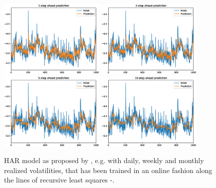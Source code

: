 \begin{figure}
    \begin{center}
        \includegraphics[width=0.45\textwidth]{Plots/Prediction/HAR_1step.eps}
        \includegraphics[width=0.45\textwidth]{Plots/Prediction/HAR_2step.eps} \\
        \includegraphics[width=0.45\textwidth]{Plots/Prediction/HAR_5step.eps}
        \includegraphics[width=0.45\textwidth]{Plots/Prediction/HAR_10step.eps}
    \end{center}
    \caption{HAR model as proposed by \cite{Corsi2009}, e.g. with daily, weekly and monthly realized volatilities, that has been trained in an online fashion along the lines of recursive least squares -.}
    \label{FIG:HAR}
\end{figure}



